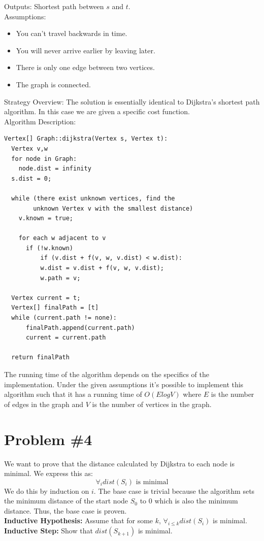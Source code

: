 \documentclass{article}
\begin{document}
Outputs: Shortest path between $s$ and $t$.\\

Assumptions:
\begin{itemize}
    \item You can't travel backwards in time.
    \item You will never arrive earlier by leaving later.
    \item There is only one edge between two vertices.
    \item The graph is connected.
\end{itemize}

Strategy Overview:
The solution is essentially identical to Dijkstra's shortest path algorithm. In this case we are given a specific cost function.\\

Algorithm Description:
\begin{lstlisting}
Vertex[] Graph::dijkstra(Vertex s, Vertex t):
  Vertex v,w
  for node in Graph: 
    node.dist = infinity
  s.dist = 0;

  while (there exist unknown vertices, find the 
        unknown Vertex v with the smallest distance)
    v.known = true;

    for each w adjacent to v
      if (!w.known)
          if (v.dist + f(v, w, v.dist) < w.dist):
          w.dist = v.dist + f(v, w, v.dist);
          w.path = v;
        
  Vertex current = t;
  Vertex[] finalPath = [t]
  while (current.path != none):
      finalPath.append(current.path)
      current = current.path

  return finalPath

\end{lstlisting}

The running time of the algorithm depends on the specifics of the implementation. Under the given assumptions it's possible to implement this algorithm such that it has a running time of $O(ElogV)$ where $E$ is the number of edges in the graph and $V$ is the number of vertices in the graph.

\section*{Problem \#4}
We want to prove that the distance calculated by Dijkstra to each node is minimal. We express this as:
$$\forall_i dist(S_i)\text{ is minimal}$$
We do this by induction on $i$. The base case is trivial because the algorithm sets the minimum distance of the start node $S_0$ to 0 which is also the minimum distance. Thus, the base case is proven.\\
\textbf{Inductive Hypothesis:} Assume that for some $k$, $\forall_{i\le k}dist(S_i)$ is minimal.\\
\textbf{Inductive Step:} Show that $dist(S_{k+1})$ is minimal.\\
\end{document}
